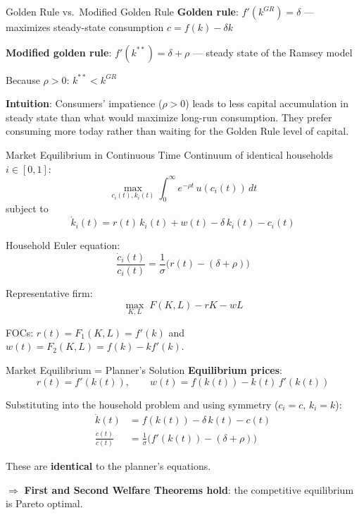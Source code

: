 \documentclass[blue]{beamer}
\begin{document}
\begin{frame}{Golden Rule vs.\ Modified Golden Rule}
	\textbf{Golden rule}: $f'(k^{GR}) = \delta$ --- maximizes steady-state consumption $c = f(k) - \delta k$
	
	\bigskip
	\textbf{Modified golden rule}: $f'(k^{**}) = \delta + \rho$ --- steady state of the Ramsey model
	
	\bigskip
	Because $\rho > 0$: $k^{**} < k^{GR}$
	
	\bigskip
	\textbf{Intuition}: Consumers' impatience ($\rho > 0$) leads to less capital accumulation in steady state than what would maximize long-run consumption. They prefer consuming more today rather than waiting for the Golden Rule level of capital.
\end{frame}

\begin{frame}{Market Equilibrium in Continuous Time}
	Continuum of identical households $i \in [0,1]$:
	\[
	\max_{c_i(t), k_i(t)} \int_0^\infty e^{-\rho t}\, u(c_i(t))\, dt
	\]
	subject to
	\[
	\dot{k}_i(t) = r(t)\, k_i(t) + w(t) - \delta\, k_i(t) - c_i(t)
	\]
	
	Household Euler equation:
	\[
	\frac{\dot{c}_i(t)}{c_i(t)} = \frac{1}{\sigma}\bigl(r(t) - (\delta + \rho)\bigr)
	\]
	
	Representative firm: 
	$$
	\max_{K,L}\; F(K,L) - rK - wL
	$$
	
	FOCs: $r(t) = F_1(K,L) = f'(k)$ and $w(t) = F_2(K,L) = f(k) - kf'(k)$.
\end{frame}


\begin{frame}{Market Equilibrium = Planner's Solution}
	\textbf{Equilibrium prices}:
	\[
	r(t) = f'(k(t)), \qquad w(t) = f(k(t)) - k(t)\, f'(k(t))
	\]
	
	Substituting into the household problem and using symmetry ($c_i = c$, $k_i = k$):
	\begin{align*}
		\dot{k}(t) &= f(k(t)) - \delta\, k(t) - c(t) \\
		\frac{\dot{c}(t)}{c(t)} &= \frac{1}{\sigma}\bigl(f'(k(t)) - (\delta + \rho)\bigr)
	\end{align*}
	
	These are \textbf{identical} to the planner's equations.
	
	\bigskip
	$\Rightarrow$ \textbf{First and Second Welfare Theorems hold}: the competitive equilibrium is Pareto optimal.
\end{frame}


\end{document}

